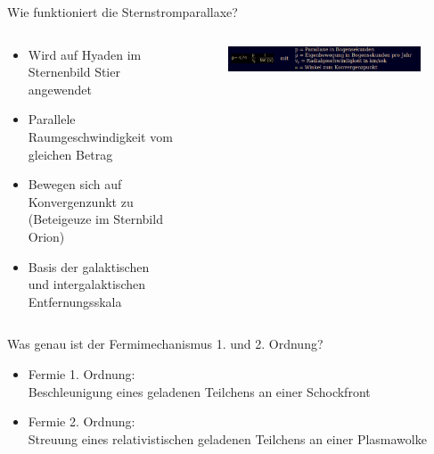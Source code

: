   \begin{frame}{Wie funktioniert die Sternstromparallaxe?}
    \begin{columns}
   \begin{column}{0.5\textwidth}
    \begin{itemize}
      \setlength\itemsep{2em}
      \item Wird auf Hyaden im Sternenbild Stier angewendet
      \item Parallele Raumgeschwindigkeit vom gleichen Betrag
      \item Bewegen sich auf Konvergenzunkt zu (Beteigeuze im Sternbild Orion)
      \item Basis der galaktischen und intergalaktischen Entfernungsskala
     \end{itemize}
  \vspace{2em}
  \end{column}
  \begin{column}{0.5\textwidth}
  \begin{figure}
    \centering
    \includegraphics[width=\textwidth]{images/sternstromparallaxe.png}
  \end{figure}
  \end{column}
    \end{columns}
  \end{frame}


  \begin{frame}{Was genau ist der Fermimechanismus 1. und 2. Ordnung?}

    \begin{itemize}
      \setlength\itemsep{2em}
      \item Fermie 1. Ordnung:\\[1em]
            Beschleunigung eines geladenen Teilchens an einer Schockfront
      \item Fermie 2. Ordnung:\\[1em]
            Streuung eines relativistischen geladenen Teilchens an einer Plasmawolke
     \end{itemize}

  \end{frame}

